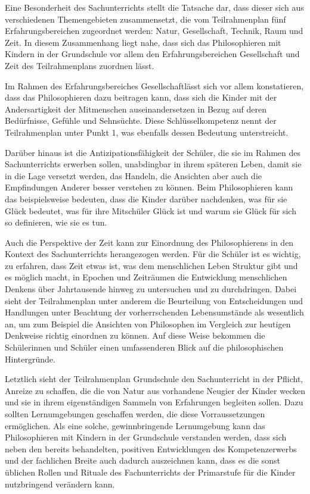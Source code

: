 Eine Besonderheit des Sachunterrichts stellt die Tatsache dar, dass dieser sich aus verschiedenen Themengebieten zusammensetzt, die vom Teilrahmenplan fünf Erfahrungsbereichen zugeordnet werden: Natur, Gesellschaft, Technik, Raum und Zeit. 
In diesem Zusammenhang liegt nahe, dass sich das Philosophieren mit Kindern in der Grundschule vor allem den Erfahrungsbereichen \glqq Gesellschaft\grqq{} und \glqq Zeit\grqq{} des Teilrahmenplans zuordnen lässt. 

Im Rahmen des Erfahrungsbereiches \glqq Gesellschaft\grqq lässt sich vor allem konstatieren, dass das Philosophieren dazu beitragen kann, dass sich die Kinder mit der Andersartigkeit der Mitmenschen auseinandersetzen in Bezug auf deren Bedürfnisse, Gefühle und Sehnsüchte. 
Diese Schlüsselkompetenz nennt der Teilrahmenplan unter Punkt 1, was ebenfalls dessen Bedeutung unterstreicht. 

Darüber hinaus ist die Antizipationsfähigkeit der Schüler, die sie im Rahmen des Sachunterrichts erwerben sollen, unabdingbar in ihrem späteren Leben, damit sie in die Lage versetzt werden, das Handeln, die Ansichten aber auch die Empfindungen Anderer besser verstehen zu können. 
Beim Philosophieren kann das beispielsweise bedeuten, dass die Kinder darüber nachdenken, was für sie Glück bedeutet, was für ihre Mitschüler Glück ist und warum sie Glück für sich so definieren, wie sie es tun. 

Auch die Perspektive der Zeit kann zur Einordnung des Philosophierens in den Kontext des Sachunterrichts herangezogen werden. 
Für die Schüler ist es wichtig, zu erfahren, dass Zeit etwas ist, was dem menschlichen Leben Struktur gibt und es möglich macht, in Epochen und Zeiträumen die Entwicklung menschlichen Denkens über Jahrtausende hinweg zu untersuchen und zu durchdringen. 
Dabei sieht der Teilrahmenplan unter anderem die \glqq Beurteilung von Entscheidungen und Handlungen\grqq{}\cite{MDFJ06, S.15} unter Beachtung der vorherrschenden Lebensumstände als wesentlich an, um zum Beispiel die Ansichten von Philosophen im Vergleich zur heutigen Denkweise richtig einordnen zu können. 
Auf diese Weise bekommen die Schülerinnen und Schüler einen umfassenderen Blick auf die philosophischen Hintergründe.

Letztlich sieht der Teilrahmenplan Grundschule den Sachunterricht in der Pflicht, Anreize zu schaffen, die die von Natur aus vorhandene Neugier der Kinder wecken und sie in ihrem eigenständigen Sammeln von Erfahrungen begleiten sollen. 
Dazu sollten Lernumgebungen geschaffen werden, die diese Vorraussetzungen ermöglichen. 
Als eine solche, gewinnbringende Lernumgebung kann das Philosophieren mit Kindern in der Grundschule verstanden werden, dass sich neben den bereits behandelten, positiven Entwicklungen des Kompetenzerwerbs und der fachlichen Breite
auch dadurch auszeichnen kann, dass es die sonst üblichen Rollen und Rituale des Fachunterrichts der Primarstufe für die Kinder nutzbringend verändern kann.

